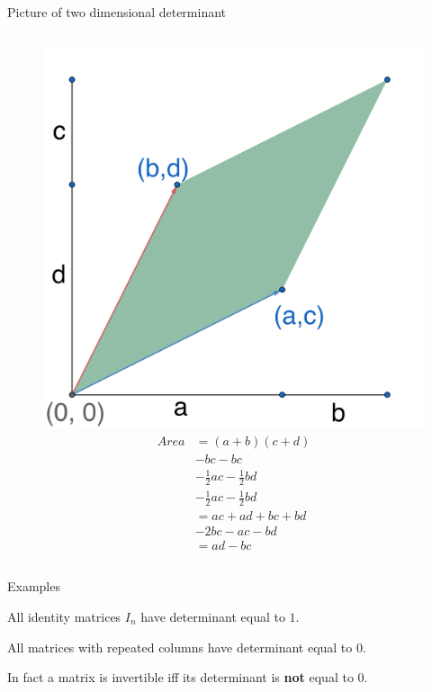 \documentclass{beamer}
\begin{document}
\begin{frame}{Picture of two dimensional determinant}
  \begin{figure}
    \begin{columns}
      \includegraphics[height=0.8\textheight]{2018-09027geogebra-export.png}
      \hspace{-2cm}
      \begin{align*}
        Area &= (a+b)(c+d)\\
             &-bc-bc\\
             &-\frac{1}{2}ac-\frac{1}{2}bd\\
             &-\frac{1}{2}ac-\frac{1}{2}bd\\
             &= ac+ad+bc+bd\\
             &-2bc-ac-bd\\
             &= ad-bc
      \end{align*}
    \end{columns}
  \end{figure}
\end{frame}

\begin{frame}{Examples}
  \begin{example}
    All identity matrices $I_n$ have determinant equal to $1$.
  \end{example}
  \begin{example}
    All matrices with repeated columns have determinant equal to $0$.
  \end{example}
  \begin{example}
    In fact a matrix is invertible iff its determinant is {\bf not} equal to $0$.
  \end{example}
\end{frame}
\end{document}

